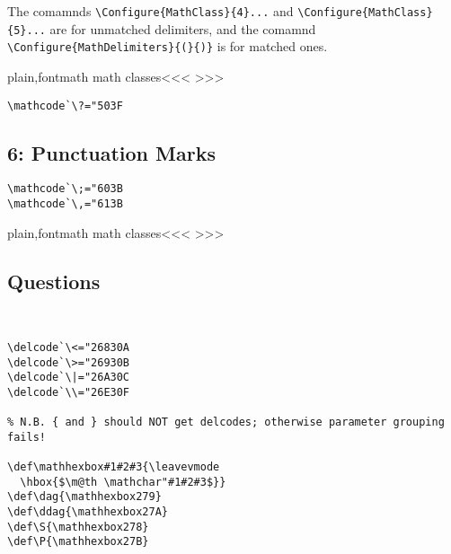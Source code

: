 {{{{{{The comamnds \verb'\Configure{MathClass}{4}...'
and \verb'\Configure{MathClass}{5}...'
are for unmatched delimiters, and the comamnd
\verb'\Configure{MathDelimiters}{(}{)}' is for matched ones.


\<plain,fontmath math classes\><<<
>>>

\begin{verbatim}
\mathcode`\?="503F
\end{verbatim}

\subsection{6: Punctuation Marks}

\begin{verbatim}
\mathcode`\;="603B
\mathcode`\,="613B
\end{verbatim}

\<plain,fontmath math classes\><<<
>>>

\subsection{Questions}

\begin{verbatim}


\delcode`\<="26830A
\delcode`\>="26930B
\delcode`\|="26A30C
\delcode`\\="26E30F

% N.B. { and } should NOT get delcodes; otherwise parameter grouping fails!

\def\mathhexbox#1#2#3{\leavevmode
  \hbox{$\m@th \mathchar"#1#2#3$}}
\def\dag{\mathhexbox279}
\def\ddag{\mathhexbox27A}
\def\S{\mathhexbox278}
\def\P{\mathhexbox27B}
\end{verbatim}

}}}}}}
